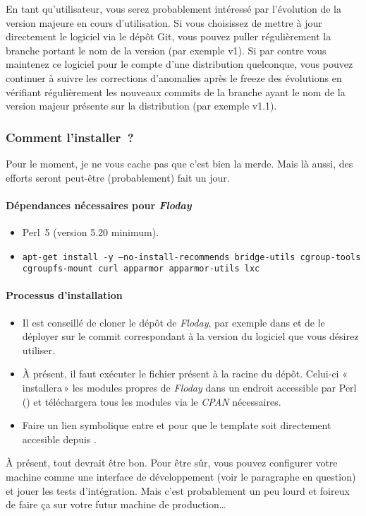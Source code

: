 En tant qu'utilisateur, vous serez probablement intéressé par l'évolution de la version majeure en cours d'utilisation. Si vous choisissez de mettre à jour directement le logiciel via le dépôt Git, vous pouvez puller régulièrement la branche portant le nom de la version (par exemple v1).
Si par contre vous maintenez ce logiciel pour le compte d'une distribution quelconque, vous pouvez continuer à suivre les corrections d'anomalies après le freeze des évolutions en vérifiant régulièrement les nouveaux commits de la branche ayant le nom de la version majeur présente sur la distribution (par exemple v1.1).

\subsubsection{Comment l'installer~?}

Pour le moment, je ne vous cache pas que c'est bien la merde.
Mais là aussi, des efforts seront peut-être (probablement) fait un jour.

\paragraph{Dépendances nécessaires pour \emph{Floday}}
\begin{itemize}
	\item Perl~5 (version 5.20 minimum).
	\item \texttt{apt-get install -y --no-install-recommends bridge-utils cgroup-tools\\cgroupfs-mount curl apparmor apparmor-utils lxc}
\end{itemize}

\paragraph{Processus d'installation}

\begin{itemize}
	\item Il est conseillé de cloner le dépôt de \emph{Floday}, par exemple dans  et de le déployer sur le commit correspondant à la version du logiciel que vous désirez utiliser.
	\item À présent, il faut exécuter le fichier  présent à la racine du dépôt.
		Celui-ci «\,installera\,» les modules propres de \emph{Floday} dans un endroit accessible par Perl () et téléchargera tous les modules via le \emph{CPAN} nécessaires.
	\item Faire un lien symbolique entre  et  pour que le template soit directement accesible depuis .
\end{itemize}

À présent, tout devrait être bon. Pour être sûr, vous pouvez configurer votre machine comme une interface de développement (voir le paragraphe en question) et jouer les tests d'intégration.
Mais c'est probablement un peu lourd et foireux de faire ça sur votre futur machine de production\dots
